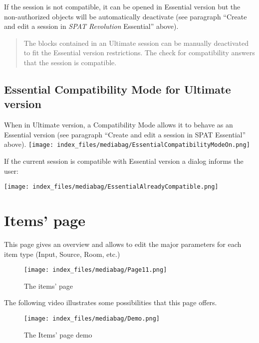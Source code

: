 \documentclass[
  letterpaper,
  DIV=11,
  numbers=noendperiod]{scrreport}
\begin{document}
If the session is not compatible, it can be opened in Essential version
but the non-authorized objects will be automatically deactivate (see
paragraph ``Create and edit a session in \emph{SPAT Revolution}
Essential'' above).

\begin{quote}
The blocks contained in an Ultimate session can be manually deactivated
to fit the Essential version restrictions. The check for compatibility
answers that the session is compatible.
\end{quote}

\hypertarget{essential-compatibility-mode-for-ultimate-version}{%
\section{Essential Compatibility Mode for Ultimate
version}\label{essential-compatibility-mode-for-ultimate-version}}

When in Ultimate version, a Compatibility Mode allows it to behave as an
Essential version (see paragraph ``Create and edit a session in SPAT
Essential'' above).
\texttt{[image: index\_files/mediabag/EssentialCompatibilityModeOn.png]}

If the current session is compatible with Essential version a dialog
informs the user:

\texttt{[image: index\_files/mediabag/EssentialAlreadyCompatible.png]}

\hypertarget{items-page}{%
\chapter{Items' page}\label{items-page}}

This page gives an overview and allows to edit the major parameters for
each item type (Input, Source, Room, etc.)

\begin{figure}

{\centering \texttt{[image: index\_files/mediabag/Page11.png]}

}

\caption{The items' page}

\end{figure}

The following video illustrates some possibilities that this page
offers.

\begin{figure}

{\centering \texttt{[image: index\_files/mediabag/Demo.png]}

}

\caption{The Items' page demo}

\end{figure}
\end{document}
